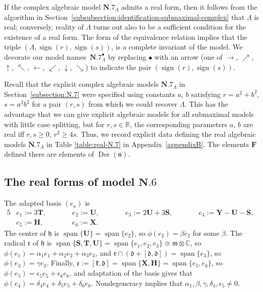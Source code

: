 \documentclass[pdftex]{sigma}
\DeclareMathOperator{\Der} {Der}
\DeclareMathOperator{\sign}{sign}
\DeclareMathOperator{\spanOperator}{span}
\newcommand{\Span}[1]{\spanOperator\{{#1}\}}
\newcommand{\bbC}{\mathbb{C}}
\newcommand{\bbR}{\mathbb{R}}
\newcommand{\mbF}{\mathbf{F}}
\newcommand{\mbH}{\mathbf{H}}
\newcommand{\mbS}{\mathbf{S}}
\newcommand{\mbT}{\mathbf{T}}
\newcommand{\mbU}{\mathbf{U}}
\newcommand{\mbX}{\mathbf{X}}
\newcommand{\mbY}{\mathbf{Y}}
\newcommand{\mfd} {\mathfrak{d}}
\newcommand{\mfe} {\mathfrak{e}}
\newcommand{\mfh} {\mathfrak{h}}
\newcommand{\mfk} {\mathfrak{k}}
\newcommand{\mfm} {\mathfrak{m}}
\newcommand{\mfn} {\mathfrak{n}}
\newcommand{\mfr} {\mathfrak{r}}
\numberwithin{equation}{section}
\begin{document}
If the complex algebraic model $\mathbf{N.7}_\Lambda$ admits a real form, then it follows from the algorithm in Section~\ref{subsubsection:identification-submaximal-complex} that $\Lambda$ is real; conversely, reality of $\Lambda$ turns out also to be a sufficient condition for the existence of a real form. The form of the equivalence relation implies that the triple $(\Lambda, \sign(r), \sign(s))$, is a complete invariant of the model. We decorate our model names~$\mathbf{N.7}_\Lambda^\bullet$ by replacing $\bullet$ with an arrow (one of $\rightarrow$, $\nearrow$, $\uparrow$, $\nwarrow$, $\leftarrow$, $\swarrow$, $\downarrow$, $\searrow$) to indicate the pair $(\sign(r), \sign(s))$.

Recall that the explicit complex algebraic models $\mathbf{N.7}_\Lambda$ in Section~\ref{subsection:N.7} were specified using constants $a$, $b$ satisfying $r = a^2 + b^2$, $s = a^2 b^2$ for a pair $(r, s)$ from which we could recover $\Lambda$. This has the advantage that we can give explicit algebraic models for all submaximal models with little case splitting, but for $r, s \in \bbR$, the corresponding parameters $a$, $b$ are real iff $r, s \geq 0$, $r^2 \geq 4 s$. Thus, we record explicit data defining the real algebraic models $\mathbf{N.7}_\Lambda$ in Table \ref{table:real-N.7} in Appendix~\ref{appendixB}. The elements $\mbF$ defined there are elements of $\Der(\mfn)$.

\subsection[The real forms of model $\mathbf{N.6}$]{The real forms of model $\boldsymbol{\mathbf{N.6}}$}\label{subsection:N.6-real}
The adapted basis $(e_a)$ is
\begin{alignat*}{5}
&	e_1 := 3 \mbT , \qquad && e_2 := \mbU , \qquad && 	e_3 := 2 \mbU + 3 \mbS , \qquad && 	e_4 := \mbY - \mbU - \mbS , & \\
&	e_5 := \mbH , \qquad && 	e_6 := \mbX . && && &
\end{alignat*}
The center of $\mfh$ is $\Span{\mbU} = \Span{e_2}$, so $\phi(e_2) = \beta e_2$ for some $\beta$. The radical $\mfr$ of $\mfh$ is $\Span{\mbS, \mbT, \mbU} = \Span{e_1, e_2, e_3} \cong \mfm \otimes \bbC$, so $\phi(e_1) = \alpha_1 e_1 + \alpha_2 e_2 + \alpha_3 e_3$, and $\mfr \cap (\mfd + [\mfd, \mfd]) = \Span{e_3}$, so $\phi(e_3) = \gamma e_3$. Finally, $\mfe := [\mfk, \mfd] = \Span{\mbX, \mbH} = \Span{e_5, e_6}$, so $\phi(e_5) = \epsilon_5 e_5 + \epsilon_6 e_6$, and adaptation of the basis gives that $\phi(e_4) = \delta_4 e_4 + \delta_5 e_5 + \delta_6 e_6$. Nondegeneracy implies that $\alpha_1, \beta, \gamma, \delta_4, \epsilon_5 \neq 0$.
\end{document}
